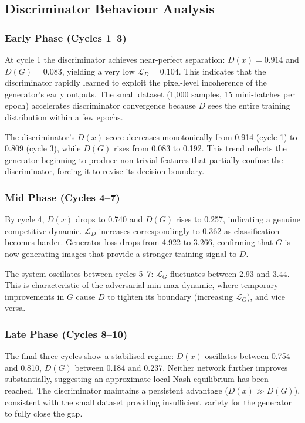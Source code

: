 \documentclass[conference]{IEEEtran}
\begin{document}
\subsection{Discriminator Behaviour Analysis}
\label{ssec:disc_analysis}

\subsubsection{Early Phase (Cycles 1--3)}
At cycle 1 the discriminator achieves near-perfect separation: $D(x) = 0.914$ and $D(G) = 0.083$, yielding a very low $\mathcal{L}_D = 0.104$. This indicates that the discriminator rapidly learned to exploit the pixel-level incoherence of the generator's early outputs. The small dataset (1{,}000 samples, 15 mini-batches per epoch) accelerates discriminator convergence because $D$ sees the entire training distribution within a few epochs.

The discriminator's $D(x)$ score decreases monotonically from 0.914 (cycle 1) to 0.809 (cycle 3), while $D(G)$ rises from 0.083 to 0.192. This trend reflects the generator beginning to produce non-trivial features that partially confuse the discriminator, forcing it to revise its decision boundary.

\subsubsection{Mid Phase (Cycles 4--7)}
By cycle 4, $D(x)$ drops to 0.740 and $D(G)$ rises to 0.257, indicating a genuine competitive dynamic. $\mathcal{L}_D$ increases correspondingly to 0.362 as classification becomes harder. Generator loss drops from 4.922 to 3.266, confirming that $G$ is now generating images that provide a stronger training signal to $D$.

The system oscillates between cycles 5--7: $\mathcal{L}_G$ fluctuates between 2.93 and 3.44. This is characteristic of the adversarial min-max dynamic, where temporary improvements in $G$ cause $D$ to tighten its boundary (increasing $\mathcal{L}_G$), and vice versa.

\subsubsection{Late Phase (Cycles 8--10)}
The final three cycles show a stabilised regime: $D(x)$ oscillates between 0.754 and 0.810, $D(G)$ between 0.184 and 0.237. Neither network further improves substantially, suggesting an approximate local Nash equilibrium has been reached. The discriminator maintains a persistent advantage ($D(x) \gg D(G)$), consistent with the small dataset providing insufficient variety for the generator to fully close the gap.
\end{document}
